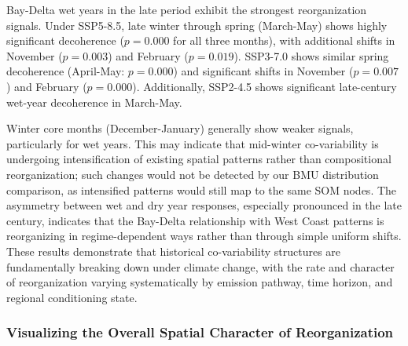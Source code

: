Bay-Delta wet years in the late period exhibit the strongest reorganization signals.
%
Under SSP5-8.5, late winter through spring (March-May) shows highly significant decoherence ($p = 0.000$ for all three months), with additional shifts in November ($p = 0.003$) and February ($p = 0.019$).
%
SSP3-7.0 shows similar spring decoherence (April-May: $p = 0.000$) and significant shifts in November ($p = 0.007$) and February ($p = 0.000$).
%
Additionally, SSP2-4.5 shows significant late-century wet-year decoherence in March-May.

Winter core months (December-January) generally show weaker signals, particularly for wet years.
%
This may indicate that mid-winter co-variability is undergoing intensification of existing spatial patterns rather than compositional reorganization; such changes would not be detected by our BMU distribution comparison, as intensified patterns would still map to the same SOM nodes.
%
The asymmetry between wet and dry year responses, especially pronounced in the late century, indicates that the Bay-Delta relationship with West Coast patterns is reorganizing in regime-dependent ways rather than through simple uniform shifts.
%
These results demonstrate that historical co-variability structures are fundamentally breaking down under climate change, with the rate and character of reorganization varying systematically by emission pathway, time horizon, and regional conditioning state.

%



\subsubsection{Visualizing the Overall Spatial Character of Reorganization}\label{ssec:cumulative_change}

